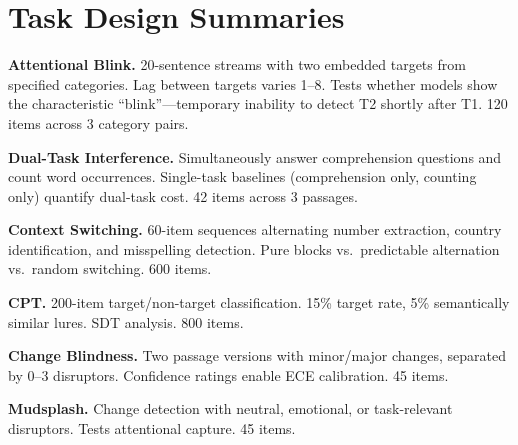 \documentclass[11pt,twocolumn]{article}
\begin{document}
\section{Task Design Summaries}

\textbf{Attentional Blink.} 20-sentence streams with two embedded targets from specified categories. Lag between targets varies 1--8. Tests whether models show the characteristic ``blink''---temporary inability to detect T2 shortly after T1. 120 items across 3 category pairs.

\textbf{Dual-Task Interference.} Simultaneously answer comprehension questions and count word occurrences. Single-task baselines (comprehension only, counting only) quantify dual-task cost. 42 items across 3 passages.

\textbf{Context Switching.} 60-item sequences alternating number extraction, country identification, and misspelling detection. Pure blocks vs.\ predictable alternation vs.\ random switching. 600 items.

\textbf{CPT.} 200-item target/non-target classification. 15\% target rate, 5\% semantically similar lures. SDT analysis. 800 items.

\textbf{Change Blindness.} Two passage versions with minor/major changes, separated by 0--3 disruptors. Confidence ratings enable ECE calibration. 45 items.

\textbf{Mudsplash.} Change detection with neutral, emotional, or task-relevant disruptors. Tests attentional capture. 45 items.
\end{document}
